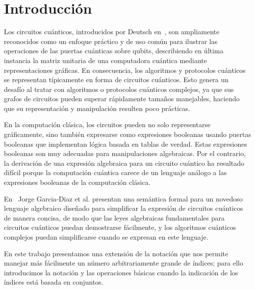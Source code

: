 \section{Introducción}

Los circuitos cuánticos, introducidos por Deutsch en~\cite{Deutsch1989}, son ampliamente reconocidos como un enfoque práctico y de uso común para ilustrar las operaciones de las puertas cuánticas sobre qubits, describiendo en última instancia la matriz unitaria de una computadora cuántica mediante representaciones gráficas.
En consecuencia, los algoritmos y protocolos cuánticos se representan típicamente en forma de circuitos cuánticos.
Esto genera un desafío al tratar con algoritmos o protocolos cuánticos complejos, ya que sus grafos de circuitos pueden superar rápidamente tamaños manejables, haciendo que su representación y manipulación resulten poco prácticas.

En la computación clásica, los circuitos pueden no solo representarse gráficamente, sino también expresarse como expresiones booleanas usando puertas booleanas que implementan lógica basada en tablas de verdad.
Estas expresiones booleanas son muy adecuadas para manipulaciones algebraicas.
Por el contrario, la derivación de una expresión algebraica para un circuito cuántico ha resultado difícil porque la computación cuántica carece de un lenguaje análogo a las expresiones booleanas de la computación clásica.

En~\cite{reina2024ix} Jorge Garcia-Diaz et al. presentan una semántica formal para un novedoso lenguaje algebraico diseñado para
simplificar la expresión de circuitos cuánticos de manera concisa, de modo que las leyes algebraicas fundamentales para circuitos cuánticos puedan demostrarse fácilmente, y los algoritmos cuánticos complejos puedan simplificarse cuando se expresan en este lenguaje.

En este trabajo presentamos una extensión de la notación que nos permite manejar más fácilmente un número arbitrariamente grande de índices; para ello introducimos la notación y las operaciones básicas cuando la indicación de los índices está basada en conjuntos.
